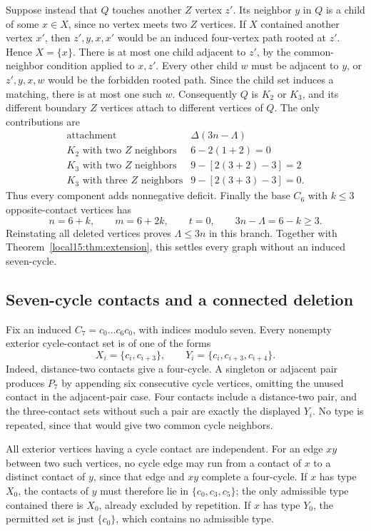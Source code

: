 \documentclass[11pt,a4paper]{article}
\theoremstyle{definition}\newtheorem{definition}[theorem]{Definition}
\theoremstyle{remark}\newtheorem{remark}[theorem]{Remark}
\begin{document}
Suppose instead that $Q$ touches another $Z$ vertex $z'$. Its neighbor
$y$ in $Q$ is a child of some $x\in X$, since no vertex meets two $Z$
vertices. If $X$ contained another vertex $x'$, then $z',y,x,x'$ would
be an induced four-vertex path rooted at $z'$. Hence $X=\{x\}$.
There is at most one child adjacent to $z'$, by the common-neighbor
condition applied to $x,z'$. Every other child $w$ must be adjacent to
$y$, or $z',y,x,w$ would be the forbidden rooted path. Since the child
set induces a matching, there is at most one such $w$. Consequently
$Q$ is $K_2$ or $K_3$, and its different boundary $Z$ vertices attach
to different vertices of $Q$. The only contributions are
\[
\begin{array}{c|c}
\text{attachment}&\Delta(3n-\Lambda)\\\hline
K_2\text{ with two }Z\text{ neighbors}&6-2(1+2)=0\\
K_3\text{ with two }Z\text{ neighbors}&9-[2(3+2)-3]=2\\
K_3\text{ with three }Z\text{ neighbors}&9-[2(3+3)-3]=0.
\end{array}
\]
Thus every component adds nonnegative deficit. Finally the base $C_6$
with $k\le3$ opposite-contact vertices has
\[
 n=6+k,\qquad m=6+2k,\qquad t=0,\qquad 3n-\Lambda=6-k\ge3.
\]
Reinstating all deleted vertices proves $\Lambda\le3n$ in this branch.
Together with Theorem~\ref{local15:thm:extension}, this settles every graph
without an induced seven-cycle.

\subsection{Seven-cycle contacts and a connected deletion}
Fix an induced $C_7=c_0\dots c_6c_0$, with indices modulo seven.
Every nonempty exterior cycle-contact set is of one of the forms
\[
 X_i=\{c_i,c_{i+3}\},\qquad
 Y_i=\{c_i,c_{i+3},c_{i+4}\}.
\]
Indeed, distance-two contacts give a four-cycle. A singleton or adjacent
pair produces $P_7$ by appending six consecutive cycle vertices, omitting
the unused contact in the adjacent-pair case. Four contacts include a
distance-two pair, and the three-contact sets without such a pair are
exactly the displayed $Y_i$. No type is repeated, since that would give
two common cycle neighbors.

All exterior vertices having a cycle contact are independent. For an
edge $xy$ between two such vertices, no cycle edge may run from a
contact of $x$ to a distinct contact of $y$, since that edge and $xy$
complete a four-cycle. If $x$ has type $X_0$, the contacts of $y$ must
therefore lie in $\{c_0,c_3,c_5\}$; the only admissible type contained
there is $X_0$, already excluded by repetition. If $x$ has type $Y_0$,
the permitted set is just $\{c_0\}$, which contains no admissible type.
\end{document}
